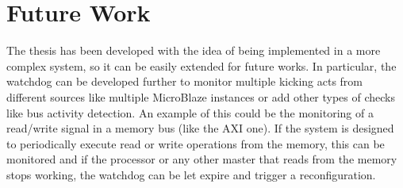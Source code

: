 








\section{Future Work}

The thesis has been developed with the idea of being implemented in a more complex system, so it can be easily extended for future works. In particular, the watchdog can be developed further to monitor multiple kicking acts from different sources like multiple MicroBlaze instances or add other types of checks like bus activity detection. An example of this could be the monitoring of a read/write signal in a memory bus (like the AXI one). If the system is designed to periodically execute read or write operations from the memory, this can be monitored and if the processor or any other master that reads from the memory stops working, the watchdog can be let expire and trigger a reconfiguration. \bigskip

